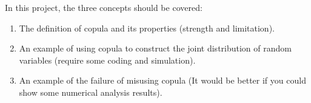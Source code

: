 \documentclass{article}
\begin{document}
In this project, the three concepts should be covered:
\begin{enumerate}
    \item The definition of copula and its properties (\eg strength and limitation).
    \item An example of using copula to construct the joint distribution of random variables (require some coding and simulation).
    \item An example of the failure of misusing copula (It would be better if you could show some numerical analysis results).
\end{enumerate}
\end{document}
